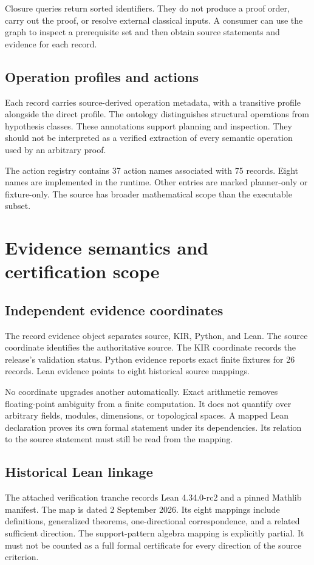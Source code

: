 \documentclass[a4paper,11pt]{article}
\begin{document}
Closure queries return sorted identifiers. They do not produce a proof order, carry out the proof, or resolve external classical inputs. A consumer can use the graph to inspect a prerequisite set and then obtain source statements and evidence for each record.
\subsection{Operation profiles and actions}
Each record carries source-derived operation metadata, with a transitive profile alongside the direct profile. The ontology distinguishes structural operations from hypothesis classes. These annotations support planning and inspection. They should not be interpreted as a verified extraction of every semantic operation used by an arbitrary proof.

The action registry contains 37 action names associated with 75 records. Eight names are implemented in the runtime. Other entries are marked planner-only or fixture-only. The source has broader mathematical scope than the executable subset.

\section{Evidence semantics and certification scope}
\subsection{Independent evidence coordinates}
The record evidence object separates source, KIR, Python, and Lean. The source coordinate identifies the authoritative source. The KIR coordinate records the release's validation status. Python evidence reports exact finite fixtures for 26 records. Lean evidence points to eight historical source mappings.

No coordinate upgrades another automatically. Exact arithmetic removes floating-point ambiguity from a finite computation. It does not quantify over arbitrary fields, modules, dimensions, or topological spaces. A mapped Lean declaration proves its own formal statement under its dependencies. Its relation to the source statement must still be read from the mapping.
\subsection{Historical Lean linkage}
The attached verification tranche records Lean 4.34.0-rc2 and a pinned Mathlib manifest. The map is dated 2 September 2026. Its eight mappings include definitions, generalized theorems, one-directional correspondence, and a related sufficient direction. The support-pattern algebra mapping is explicitly partial. It must not be counted as a full formal certificate for every direction of the source criterion.
\end{document}
